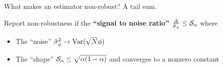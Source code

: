 \begin{frame}{What makes an estimator non-robust?  A tail sum.}

Report non-robustness if the \textbf{``signal to noise ratio''}
$\frac{\Delta}{\hat\sigma_{\phi}} \le \mathcal{S}_\alpha$ where

%
\begin{itemize}
\item The ``noise'' $\hat\sigma_{\phi}^2 \rightarrow \mathrm{Var}(\sqrt{N}\phi)$
    \citep{hampel1986robustbook}
\item The ``shape'' $\mathcal{S}_\alpha \le \sqrt{\alpha (1 - \alpha)}$
    and converges to a nonzero constant
\end{itemize}


\end{frame}
